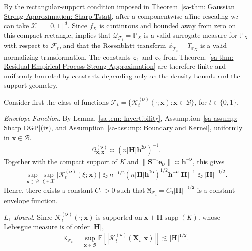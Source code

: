 \documentclass[10pt]{article}
\DeclareMathOperator{\supp}{supp}
\renewcommand{\P}{\mathbb{P}}
\newcommand{\E}{\mathbb{E}}
\newcommand{\be}{\mathbf{e}}
\newcommand{\bh}{\mathbf{h}}
\newcommand{\bH}{\mathbf{H}}
\newcommand{\bS}{\mathbf{S}}
\newcommand{\bx}{\mathbf{x}}
\newcommand{\bX}{\mathbf{X}}
\newcommand{\bnu}{\boldsymbol{\nu}}
\newcommand{\B}{\mathcal{B}}
\newcommand{\F}{\mathcal{F}}
\newcommand{\K}{\mathscr{K}}
\newcommand{\Q}{\mathcal{Q}}
\newcommand{\X}{\mathcal{X}}
\newcommand{\ttc}{\mathtt{c}}
\newcommand{\ttE}{\mathtt{E}}
\newcommand{\ttM}{\mathtt{M}}
\begin{document}
By the rectangular-support condition imposed in Theorem~\ref{sa-thm: Gaussian Strong Approximation: Sharp Tstat}, after a componentwise affine rescaling we can take $\X=[0,1]^d$. Since $f_X$ is continuous and bounded away from zero on this compact rectangle, \citet[Section 3.1]{Cattaneo-Yu_2025_AOS} implies that $\Q_{\F_t}=\P_X$ is a valid surrogate measure for $\P_X$ with respect to $\F_t$, and that the Rosenblatt transform $\phi_{\F_t}=T_{\P_X}$ is a valid normalizing transformation. The constants $\ttc_1$ and $\ttc_2$ from Theorem~\ref{sa-thm: Residual Empirical Process Strong Approximation} are therefore finite and uniformly bounded by constants depending only on the density bounds and the support geometry.

Consider first the class of functions $\F_t = \{\K_t^{(\bnu)}(\cdot; \bx): \bx \in \B\}$, for $t \in \{0,1\}$.

\medskip\textit{Envelope Function}. By Lemma~\ref{sa-lem: Invertibility}, Assumption~\ref{sa-assump: Sharp DGP}(iv), and Assumption~\ref{sa-assump: Boundary and Kernel}, uniformly in $\bx \in \B$,
\begin{align*}
    \Omega_{\bx,\bx}^{(\bnu)} \asymp (n|\bH|\bh^{2\bnu})^{-1}.
\end{align*}
Together with the compact support of $K$ and $\|\bS^{-1}\be_{\bnu}\|\asymp \bh^{-\bnu}$, this gives
\begin{align*}
    \sup_{\bx \in \B} \sup_{\xi \in \X} \big|\K_t^{(\bnu)}(\xi; \bx)\big|
    \lesssim n^{-1/2} (n|\bH|\bh^{2\bnu})^{1/2} \bh^{-\bnu} |\bH|^{-1}
    \lesssim |\bH|^{-1/2}.
\end{align*}
Hence, there exists a constant $C_1 > 0$ such that $\ttM_{\F_t} = C_1|\bH|^{-1/2}$ is a constant envelope function.

\medskip\textit{$L_1$ Bound}. Since $\K_t^{(\bnu)}(\cdot;\bx)$ is supported on $\bx+\bH\supp(K)$, whose Lebesgue measure is of order $|\bH|$,
\begin{align*}
    \ttE_{\F_t} = \sup_{\bx \in \B} \E[|\K_t^{(\bnu)}(\bX_i; \bx)|] \lesssim |\bH|^{1/2}.
\end{align*}
\end{document}
